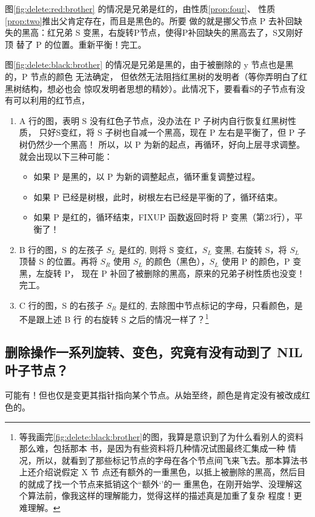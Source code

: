 \documentclass[a4paper, 11pt]{article}
\begin{document}
图\ref{fig:delete:red:brother} 的情况是兄弟是红的，由性质\ref{prop:four}、
性质\ref{prop:two}推出父肯定存在，而且是黑色的。所要
做的就是挪父节点 P 去补回缺失的黑高：红兄弟 S 变黑，右旋转P节点，使得P补回缺失的黑高去了，S又刚好顶
替了 P 的位置。重新平衡！完工。

图\ref{fig:delete:black:brother} 的情况是兄弟是黑的，由于被删除的 y 节点也是黑的，P 节点的颜色
无法确定，
但依然无法阻挡红黑树的发明者（等你弄明白了红黑树结构，想必也会
惊叹发明者思想的精妙）。此情况下，要看看S的子节点有没有可以利用的红节点，

\begin{enumerate}
\item A 行的图，表明 S 没有红色子节点，没办法在 P 子树内自行恢复红黑树性质，
只好S变红，将 S 子树也自减一个黑高，现在 P 左右是平衡了，但 P 子树仍然少一个黑高！
所以，以 P 为新的起点，再循环，好向上层寻求调整。就会出现以下三种可能：

\begin{itemize}
\item 如果 P 是黑的，以 P 为新的调整起点，循环重复调整过程。
\item 如果 P 已经是树根，此时，树根左右已经是平衡的了，循环结束。
\item 如果 P 是红的，循环结束，FIXUP 函数返回时将 P 变黑（第23行），平衡了！
\end{itemize}

\item B 行的图，S 的左孩子 $S_L$ 是红的, 则将 S 变红，$S_L$ 变黑, 右旋转 S，将 $S_L$ 顶替
S 的位置。再将 $S_R$ 使用 $S_L$ 的颜色（黑色），$S_L$ 使用 P 的颜色，P 变黑，左旋转 P，
现在 P 补回了被删除的黑高，原来的兄弟子树性质也没变！完工。

\item C 行的图，S 的右孩子 $S_R$ 是红的, 去除图中节点标记的字母，只看颜色，是不是跟上述 B 行
的右旋转 S 之后的情况一样了？\footnote{
等我画完\ref{fig:delete:black:brother}的图，我算是意识到了为什么看别人的资料那么难，包括那本
书，是因为有些资料将几种情况试图最终汇集成一种
情况，所以，就看到了那些标记节点的字母在各个节点间飞来飞去。那本算法书上还介绍说假定 X 节
点还有额外的一重黑色，以抵上被删除的黑高，然后目的就成了找一个节点来抵销这个``额外‘’的一
重黑色，在刚开始学、没理解这个算法前，像我这样的理解能力，觉得这样的描述真是加重了复杂
程度！更难理解。}

\end{enumerate}


\subsection{删除操作一系列旋转、变色，究竟有没有动到了 NIL 叶子节点？}
可能有！但也仅是变更其指针指向某个节点。从始至终，颜色是肯定没有被改成红色的。
\end{document}
